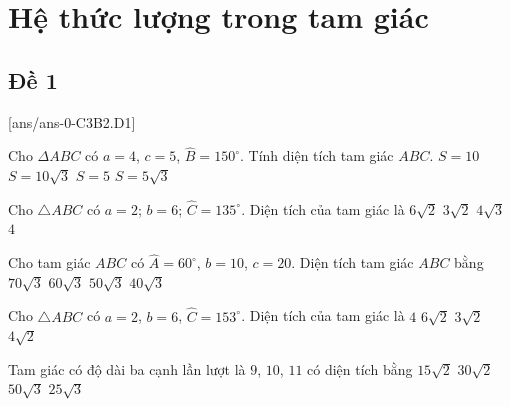 \section{Hệ thức lượng trong tam giác}

\subsection{Đề 1}
[ans/ans-0-C3B2.D1]
\caulc
\begin{ex}%
	Cho $\Delta ABC$ có $a=4$, $c=5$, $\widehat{B}=150^\circ$. Tính diện tích tam giác $ABC$.
	\choice
	{$S=10$}
	{$S=10\sqrt{3}$}
	{\True $S=5$}
	{$S=5\sqrt{3}$}
\end{ex}
\begin{ex}%
	Cho $\triangle ABC$ có $a=2$; $b=6$; $\widehat{C}=135^\circ $. Diện tích của tam giác là
	\choice
	{$6\sqrt{2}$}
	{\True $3\sqrt{2}$}
	{$4\sqrt{3}$}
	{$4$}
\end{ex}
\begin{ex}%
	Cho tam giác $ABC$ có $\widehat{A}=60^\circ$, $b=10$, $c=20$. Diện tích tam giác $ABC$ bằng
	\choice
	{$70\sqrt{3}$}
	{$60\sqrt{3}$}
	{\True $50\sqrt{3}$}
	{$40\sqrt{3}$}
\end{ex}
\begin{ex}%
	Cho $\triangle ABC$ có $a=2$, $b=6$, $\widehat{C}=153^\circ$. Diện tích của tam giác là
	\choice
	{$4$}
	{$6\sqrt{2}$}
	{\True $3\sqrt{2}$}
	{$4\sqrt{2}$}
\end{ex}
\begin{ex}%
	Tam giác có độ dài ba cạnh lần lượt là $9$, $10$, $11$ có diện tích bằng
	\choice
	{$15\sqrt{2}$}
	{\True $30\sqrt{2}$}
	{$50\sqrt{3}$}
	{$25\sqrt{3}$}
\end{ex}
